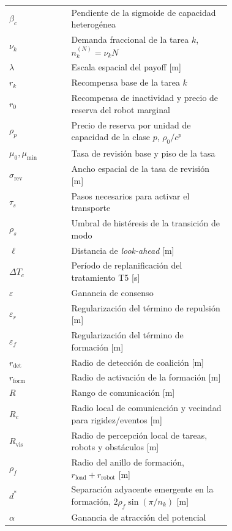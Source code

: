 \begin{longtable}{@{}l@{\hskip 2em}>{\raggedright\arraybackslash}p{0.72\linewidth}@{}}
$\beta_c$               & Pendiente de la sigmoide de capacidad heterogénea \\
$\nu_k$                 & Demanda fraccional de la tarea $k$, $n_k^{(N)}=\nu_kN$ \\
$\lambda$               & Escala espacial del payoff [m] \\
$r_k$                   & Recompensa base de la tarea $k$ \\
$r_0$                   & Recompensa de inactividad y precio de reserva del robot marginal \\
$\rho_p$                & Precio de reserva por unidad de capacidad de la clase $p$, $\rho_0/c^p$ \\
$\mu_0,\mu_{\min}$      & Tasa de revisión base y piso de la tasa \\
$\sigma_{\mathrm{rev}}$ & Ancho espacial de la tasa de revisión [m] \\
$\tau_s$                & Pasos necesarios para activar el transporte \\
$\rho_s$                & Umbral de histéresis de la transición de modo \\
$\ell$                  & Distancia de \emph{look-ahead} [m] \\
$\Delta T_c$            & Período de replanificación del tratamiento T5 [s] \\
$\varepsilon$           & Ganancia de consenso \\
$\varepsilon_r$         & Regularización del término de repulsión [m] \\
$\varepsilon_f$         & Regularización del término de formación [m] \\
$r_{\mathrm{det}}$      & Radio de detección de coalición [m] \\
$r_{\mathrm{form}}$     & Radio de activación de la formación [m] \\
$R$                     & Rango de comunicación [m] \\
$R_c$                   & Radio local de comunicación y vecindad para rigidez/eventos [m] \\
$R_{\mathrm{vis}}$      & Radio de percepción local de tareas, robots y obstáculos [m] \\
$\rho_f$                & Radio del anillo de formación, $r_{\mathrm{load}}+r_{\mathrm{robot}}$ [m] \\
$d^*$                   & Separación adyacente emergente en la formación, $2\rho_f\sin(\pi/n_k)$ [m] \\
$\alpha$                & Ganancia de atracción del potencial \\

\end{longtable}
